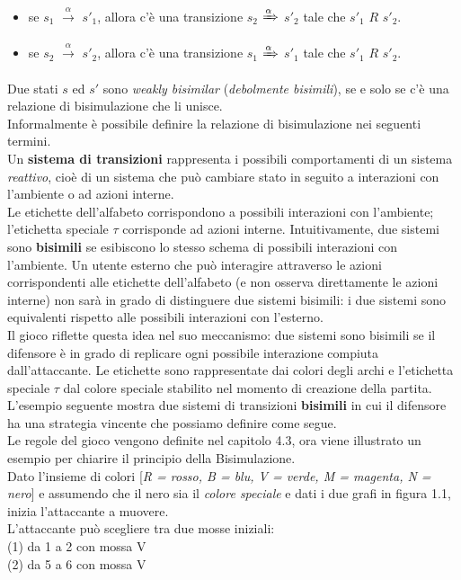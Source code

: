 \documentclass[a4paper,11pt,twoside,openright]{report}
\begin{document}
\begin{itemize}
\item se $s_1$ $\xrightarrow{\alpha}$ $s'_1$, allora c'è una transizione $s_2$ $\xRightarrow{\alpha}$ $s'_2$ tale che $s'_1$ $R$ $s'_2$.

\item se $s_2$ $\xrightarrow{\alpha}$ $s'_2$, allora c'è una transizione $s_1$ $\xRightarrow{\alpha}$ $s'_1$ tale che $s'_1$ $R$ $s'_2$.
\end{itemize}

Due stati $s$ ed $s'$ sono \textit{weakly bisimilar} (\textit{debolmente bisimili}), se e solo se c'è una relazione di bisimulazione che li unisce.\\


Informalmente è possibile definire la relazione di bisimulazione nei seguenti termini.\\
Un \textbf{sistema di transizioni} rappresenta i possibili comportamenti di un sistema \textit{reattivo}, cioè di un sistema che può cambiare stato in seguito a interazioni con l'ambiente o ad azioni interne.\\
Le etichette dell'alfabeto corrispondono a possibili interazioni con l'ambiente; l'etichetta speciale $\tau$ corrisponde ad azioni interne. Intuitivamente, due sistemi sono \textbf{bisimili} se esibiscono lo stesso schema di possibili interazioni con l'ambiente. Un utente esterno che può interagire attraverso le azioni corrispondenti alle etichette dell'alfabeto (e non osserva direttamente le azioni interne) non sarà in grado di distinguere due sistemi bisimili: i due sistemi sono equivalenti rispetto alle possibili interazioni con l'esterno.\\
Il gioco riflette questa idea nel suo meccanismo: due sistemi sono bisimili se il difensore è in grado di replicare ogni possibile interazione compiuta dall'attaccante. Le etichette sono rappresentate dai colori degli archi e l'etichetta speciale $\tau$ dal colore speciale stabilito nel momento di creazione della partita.\\
L'esempio seguente mostra due sistemi di transizioni \textbf{bisimili} in cui il difensore ha una strategia vincente che possiamo definire come segue.\\
Le regole del gioco vengono definite nel capitolo 4.3, ora viene illustrato un esempio per chiarire il principio della Bisimulazione.\\
Dato l'insieme di colori [\textit{R = rosso, B = blu, V = verde, M = magenta, N = nero}] e assumendo che il nero sia il \textit{colore speciale} e dati i due grafi in figura 1.1, inizia l'attaccante a muovere.\\
L'attaccante può scegliere tra due mosse iniziali:\\
(1) da 1 a 2 con mossa V\\
(2) da 5 a 6 con mossa V\\
\end{document}
